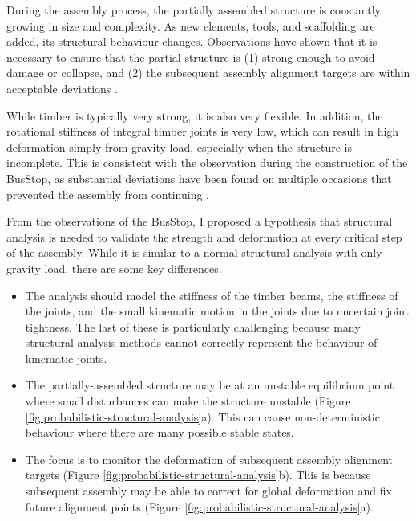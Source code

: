 During the assembly process, the partially assembled structure is constantly growing in size and complexity. As new elements, tools, and scaffolding are added, its structural behaviour changes. Observations have shown that it is necessary to ensure that the partial structure is (1) strong enough to avoid damage or collapse, and (2) the subsequent assembly alignment targets are within acceptable deviations .

While timber is typically very strong, it is also very flexible. In addition, the rotational stiffness of integral timber joints is very low, which can result in high deformation simply from gravity load, especially when the structure is incomplete. This is consistent with the observation during the construction of the BusStop, as substantial deviations have been found on multiple occasions that prevented the assembly from continuing .

From the observations of the BusStop, I proposed a hypothesis that structural analysis is needed to validate the strength and deformation at every critical step of the assembly. While it is similar to a normal structural analysis with only gravity load, there are some key differences.

\begin{itemize}
	\item The analysis should model the stiffness of the timber beams, the stiffness of the joints, and the small kinematic motion in the joints due to uncertain joint tightness. The last of these is particularly challenging because many structural analysis methods cannot correctly represent the behaviour of kinematic joints.

	\item The partially-assembled structure may be at an unstable equilibrium point where small disturbances can make the structure unstable (Figure \ref{fig:probabilistic-structural-analysis}a). This can cause non-deterministic behaviour where there are many possible stable states.

	\item The focus is to monitor the deformation of subsequent assembly alignment targets (Figure \ref{fig:probabilistic-structural-analysis}b). This is because subsequent assembly may be able to correct for global deformation and fix future alignment points (Figure \ref{fig:probabilistic-structural-analysis}a).
\end{itemize}

